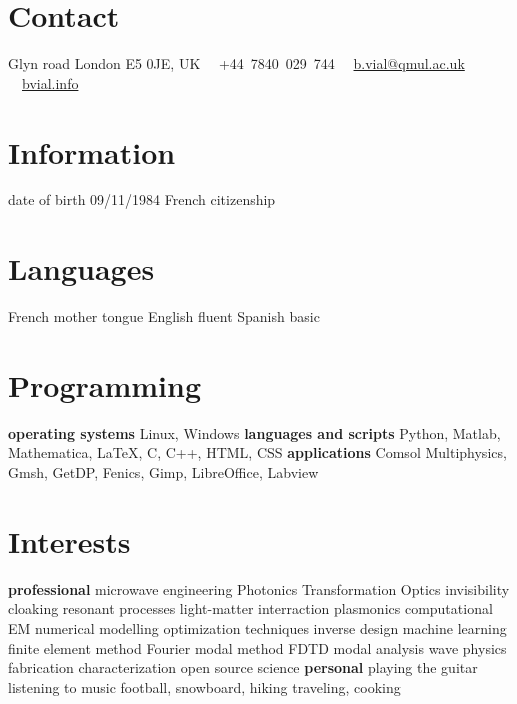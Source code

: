 \documentclass[]{cv} %
\begin{document}


\begin{aside} %
\section{Contact}
 Glyn road
London E5 0JE, UK
\faPhone~~+44~7840~029~744
\faEnvelope~~\href{mailto:b.vial@qmul.ac.uk}{b.vial@qmul.ac.uk}
\faUser~~\href{http://bvial.info/}{bvial.info}
\section{Information}
date of birth 09/11/1984
French citizenship
\section{Languages}
French mother tongue
English fluent
Spanish basic
\section{Programming}
\textbf{operating systems}
Linux, Windows
\textbf{languages and scripts}
Python, Matlab, Mathematica, \LaTeX, C, C++, HTML, CSS
\textbf{applications}
Comsol Multiphysics, Gmsh, GetDP, Fenics, Gimp, LibreOffice, Labview
\section{Interests}
\textbf{professional}
microwave engineering
Photonics
Transformation Optics
invisibility cloaking
resonant processes
light-matter interraction
plasmonics
computational EM
numerical modelling
optimization techniques
inverse design
machine learning
finite element method
Fourier modal method
FDTD
modal analysis
wave physics
fabrication
characterization
open source science
\textbf{personal}
playing the guitar
listening to music
football, snowboard, hiking
traveling, cooking
\end{aside}


\end{document}
